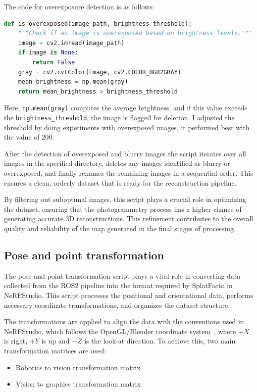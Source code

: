 The code for overexposure detection is as follows:

\FloatBarrier
\begin{lstlisting}[language=python,frame=single,float=!ht]
def is_overexposed(image_path, brightness_threshold):
    """Check if an image is overexposed based on brightness levels."""
    image = cv2.imread(image_path)
    if image is None:
        return False
    gray = cv2.cvtColor(image, cv2.COLOR_BGR2GRAY)
    mean_brightness = np.mean(gray)
    return mean_brightness > brightness_threshold
\end{lstlisting}
\FloatBarrier
Here, \verb|np.mean(gray)| computes the average brightness, and if this value exceeds the \verb|brightness_threshold|, the image is flagged for deletion. I adjusted the threshold by doing experiments with overexposed images, it performed best with the value of 200.

After the detection of overexposed and blurry images the script iterates over all images in the specified directory, deletes any images identified as blurry or overexposed, and finally renames the remaining images in a sequential order. This ensures a clean, orderly dataset that is ready for the reconstruction pipeline.

By filtering out suboptimal images, this script plays a crucial role in optimizing the dataset, ensuring that the photogrammetry process has a higher chance of generating accurate 3D reconstructions. This refinement contributes to the overall quality and reliability of the map generated in the final stages of processing.

\subsection{Pose and point transformation}

The pose and point transformation script plays a vital role in converting data collected from the ROS2 pipeline into the format required by SplatFacto in NeRFStudio. This script processes the positional and orientational data, performs necessary coordinate transformations, and organizes the dataset structure.

The transformations are applied to align the data with the conventions used in NeRFStudio, which follows the OpenGL/Blender coordinate system~\cite{opengl_coordinate_system}, where \(+X\) is right, \(+Y\) is up and \(-Z\) is the look-at direction. To achieve this, two main transformation matrices are used:

\begin{itemize}
    \item Robotics to vision transformation matrix
    \item Vision to graphics transformation matrix
\end{itemize}

